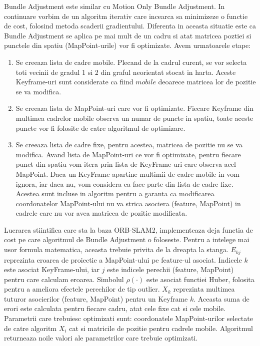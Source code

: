 \documentclass[12pt,a4paper]{report}
\begin{document}
Bundle Adjustment este similar cu Motion Only Bundle Adjustment. In continuare vorbim de un
algoritm iterativ care incearca sa minimizeze o functie de cost, folosind metoda scaderii 
gradientului. Diferenta in aceasta situatie este ca Bundle Adjustment se aplica pe mai mult 
de un cadru si atat matricea poztiei si punctele din spatiu (MapPoint-urile) vor fi optimizate.
Avem urmatoarele etape:
\begin{enumerate}
    \item Se creeaza lista de cadre mobile. Plecand de la cadrul curent, se vor selecta
    toti vecinii de gradul 1 si 2 din graful neorientat stocat in harta. Aceste Keyframe-uri
    sunt considerate ca fiind \(mobile\) deoarece matricea lor de pozitie se va modifica.  
    \item Se creeaza lista de MapPoint-uri care vor fi optimizate. Fiecare Keyframe din multimea 
    cadrelor mobile observa un numar de puncte in spatiu, toate aceste puncte vor fi folosite 
    de catre algoritmul de optimizare.
    \item Se creeaza lista de cadre fixe, pentru acestea, matricea de pozitie nu se va modifica.
    Avand lista de MapPoint-uri ce vor fi optimizate, pentru fiecare punct din spatiu
    vom itera prin lista de KeyFrame-uri care observa acel MapPoint. Daca un KeyFrame apartine 
    multimii de cadre mobile in vom ignora, iar daca nu, vom considera ca face parte din lista de
    cadre fixe. Acestea sunt incluse in algoritm pentru a garanta ca modificarea coordonatelor
    MapPoint-ului nu va strica asociera (feature, MapPoint) in cadrele care nu vor avea matricea
    de pozitie modificata. 
\end{enumerate}

Lucrarea stiintifica care sta la baza ORB-SLAM2, implementeaza deja functia de 
cost pe care algoritmul de Bundle Adjustment o foloseste. Pentru a intelege mai usor formula 
matematica, aceasta trebuie privita de la dreapta la stanga. \(E_{kj}\) reprezinta eroarea
de proiectie a MapPoint-ului pe feature-ul asociat. Indicele \(k\) este asociat KeyFrame-ului,
iar \(j\) este indicele perechii (feature, MapPoint) pentru care calculam eroarea. Simbolul 
$ \rho(\cdot) $ este asociat functiei Huber, folosita pentru a ameliora efectele perechilor de tip 
outlier. \(X_k\) reprezinta multimea tuturor asocierilor (feature, MapPoint) pentru un 
Keyframe \(k\). Aceasta suma de erori este calculata pentru fiecare cadru, atat cele fixe cat 
si cele mobile. Parametrii care trebuiesc optimizati sunt: coordonatele MapPoint-urilor 
selectate de catre algoritm \(X_i\) cat si matricile de pozitie pentru cadrele mobile. Algoritmul 
returneaza noile valori ale parametrilor care trebuie optimizati.  
\end{document}
